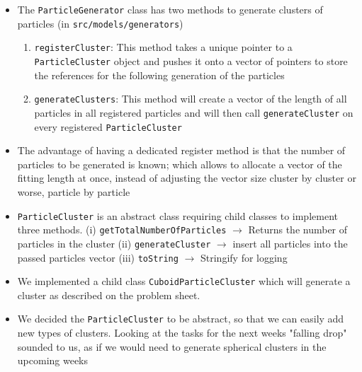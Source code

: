 \documentclass{article}
\begin{document}
\begin{itemize}
    \item The \verb|ParticleGenerator| class has two methods to generate clusters of particles (in \verb|src/models/generators|)
    \begin{enumerate}
        \item \verb|registerCluster|: This method takes a unique pointer to a \verb|ParticleCluster| object and pushes it onto a vector of pointers to store the references for the following generation of the particles
        \item \verb|generateClusters|: This method will create a vector of the length of all particles in all registered particles and will then call \verb|generateCluster| on every registered \verb|ParticleCluster|
    \end{enumerate}
    \item The advantage of having a dedicated register method is that the number of particles to be generated is known; which allows to allocate a vector of the fitting length at once, instead of adjusting the vector size cluster by cluster or worse, particle by particle
    \item \verb|ParticleCluster| is an abstract class requiring child classes to implement three methods. (i) \verb|getTotalNumberOfParticles| $\rightarrow$ Returns the number of particles in the cluster (ii) \verb|generateCluster| $\rightarrow$ insert all particles into the passed particles vector (iii) \verb|toString| $\rightarrow$ Stringify for logging
    \item We implemented a child class \verb|CuboidParticleCluster| which will generate a cluster as described on the problem sheet.
    \item We decided the \verb|ParticleCluster| to be abstract, so that we can easily add new types of clusters. Looking at the tasks for the next weeks "falling drop" sounded to us, as if we would need to generate spherical clusters in the upcoming weeks
\end{itemize}
\end{document}
